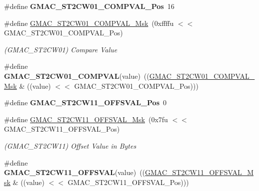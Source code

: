 \begin{DoxyCompactItemize}
\item 
\mbox{\label{group__SAMV71__GMAC_ga8fbe36dde5accb4c0df82392e741e721}} 
\#define {\bfseries G\+M\+A\+C\+\_\+\+S\+T2\+C\+W01\+\_\+\+C\+O\+M\+P\+V\+A\+L\+\_\+\+Pos}~16
\item 
\mbox{\label{group__SAMV71__GMAC_ga48da0813af6c13560c0e071608f4d6ff}} 
\#define \mbox{\hyperlink{group__SAMV71__GMAC_ga48da0813af6c13560c0e071608f4d6ff}{G\+M\+A\+C\+\_\+\+S\+T2\+C\+W01\+\_\+\+C\+O\+M\+P\+V\+A\+L\+\_\+\+Msk}}~(0xffffu $<$$<$ G\+M\+A\+C\+\_\+\+S\+T2\+C\+W01\+\_\+\+C\+O\+M\+P\+V\+A\+L\+\_\+\+Pos)
\begin{DoxyCompactList}\small\item\em (G\+M\+A\+C\+\_\+\+S\+T2\+C\+W01) Compare Value \end{DoxyCompactList}\item 
\mbox{\label{group__SAMV71__GMAC_gac018dc960294897cce619657bb4ca98b}} 
\#define {\bfseries G\+M\+A\+C\+\_\+\+S\+T2\+C\+W01\+\_\+\+C\+O\+M\+P\+V\+AL}(value)~((\mbox{\hyperlink{group__SAMV71__GMAC_ga48da0813af6c13560c0e071608f4d6ff}{G\+M\+A\+C\+\_\+\+S\+T2\+C\+W01\+\_\+\+C\+O\+M\+P\+V\+A\+L\+\_\+\+Msk}} \& ((value) $<$$<$ G\+M\+A\+C\+\_\+\+S\+T2\+C\+W01\+\_\+\+C\+O\+M\+P\+V\+A\+L\+\_\+\+Pos)))
\item 
\mbox{\label{group__SAMV71__GMAC_ga345797e545ae278cbc271ec3f1deb849}} 
\#define {\bfseries G\+M\+A\+C\+\_\+\+S\+T2\+C\+W11\+\_\+\+O\+F\+F\+S\+V\+A\+L\+\_\+\+Pos}~0
\item 
\mbox{\label{group__SAMV71__GMAC_ga1fdc32a18e762e636fc3d07b0e8bb32b}} 
\#define \mbox{\hyperlink{group__SAMV71__GMAC_ga1fdc32a18e762e636fc3d07b0e8bb32b}{G\+M\+A\+C\+\_\+\+S\+T2\+C\+W11\+\_\+\+O\+F\+F\+S\+V\+A\+L\+\_\+\+Msk}}~(0x7fu $<$$<$ G\+M\+A\+C\+\_\+\+S\+T2\+C\+W11\+\_\+\+O\+F\+F\+S\+V\+A\+L\+\_\+\+Pos)
\begin{DoxyCompactList}\small\item\em (G\+M\+A\+C\+\_\+\+S\+T2\+C\+W11) Offset Value in Bytes \end{DoxyCompactList}\item 
\mbox{\label{group__SAMV71__GMAC_ga0dc43fec2eee731ef023f6cecd7ece55}} 
\#define {\bfseries G\+M\+A\+C\+\_\+\+S\+T2\+C\+W11\+\_\+\+O\+F\+F\+S\+V\+AL}(value)~((\mbox{\hyperlink{group__SAMV71__GMAC_ga1fdc32a18e762e636fc3d07b0e8bb32b}{G\+M\+A\+C\+\_\+\+S\+T2\+C\+W11\+\_\+\+O\+F\+F\+S\+V\+A\+L\+\_\+\+Msk}} \& ((value) $<$$<$ G\+M\+A\+C\+\_\+\+S\+T2\+C\+W11\+\_\+\+O\+F\+F\+S\+V\+A\+L\+\_\+\+Pos)))

\end{DoxyCompactItemize}
